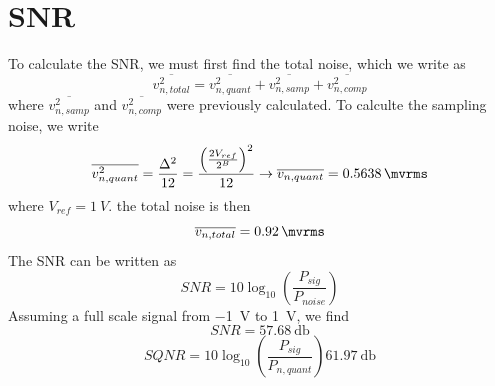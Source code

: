 \documentclass[letterpaper, notitlepage]{revtex4-1}
\begin{document}
\section{SNR}
To calculate the SNR, we must first find the total noise, which we write as
\begin{equation}
\overline{v_{n,total}^2}=\overline{v_{n,quant}^2}+\overline{v_{n,samp}^2}+\overline{v_{n,comp}^2}
\end{equation}
where $\overline{v_{n,samp}^2}$ and $\overline{v_{n,comp}^2}$ were previously calculated. To calculte the sampling noise, we write
\begin{equation}
\overline{v_{n,quant}^2}=\frac{\Delta^2}{12}=\frac{\left(\frac{2V_{ref}}{2^B}\right)^2}{12}\rightarrow\overline{v_{n,quant}}=\SI{0.5638}{\mvrms}
\end{equation}
where $V_{ref}=\SI{1}{V}$. the total noise is then
\begin{equation}
\overline{v_{n,total}}=\SI{0.92}{\mvrms}
\end{equation}
The SNR can be written as
\begin{equation}
SNR=10\log_{10}\left(\frac{P_{sig}}{P_{noise}}\right)
\end{equation}
Assuming a full scale signal from \SI{-1}{\volt} to \SI{1}{\volt}, we find
\begin{equation}
SNR=\SI{57.68}{\decibel}
\end{equation}
\begin{equation}
SQNR=10\log_{10}\left(\frac{P_{sig}}{P_{n,quant}}\right)\SI{61.97}{\decibel}
\end{equation}
\end{document}
